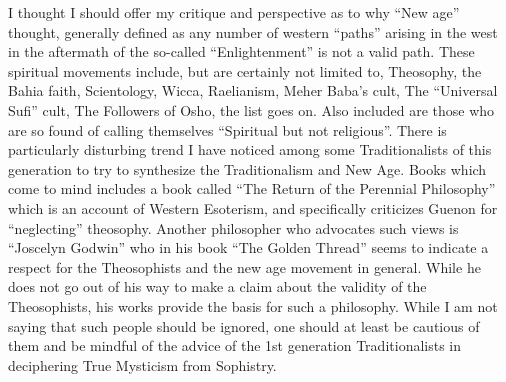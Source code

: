 I thought I should offer my critique and perspective as to why ``New age'' thought, generally defined as any number of western ``paths'' arising in the west in the aftermath of the so-called ``Enlightenment'' is not a valid path. These spiritual movements include, but are certainly not limited to, Theosophy, the Bahia faith, Scientology, Wicca, Raelianism, Meher Baba's cult, The ``Universal Sufi'' cult, The Followers of Osho, the list goes on. Also included are those who are so found of calling themselves ``Spiritual but not religious''. There is particularly disturbing trend I have noticed among some Traditionalists of this generation to try to synthesize the Traditionalism and New Age. Books which come to mind includes a book called ``The Return of the Perennial Philosophy'' which is an account of Western Esoterism, and specifically criticizes Guenon for ``neglecting'' theosophy. Another philosopher who advocates such views is ``Joscelyn Godwin'' who in his book ``The Golden Thread'' seems to indicate a respect for the Theosophists and the new age movement in general. While he does not go out of his way to make a claim about the validity of the Theosophists, his works provide the basis for such a philosophy. While I am not saying that such people should be ignored, one should at least be cautious of them and be mindful of the advice of the 1st generation Traditionalists in deciphering True Mysticism from Sophistry.

